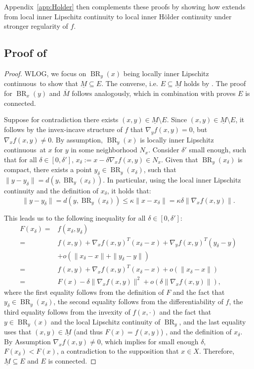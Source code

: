 \documentclass{article}
\newcommand{\lilc}{locally inner Lipschitz continuous}
\DeclareMathOperator{\BR}{BR}
\begin{document}
Appendix~\ref{app:Holder} then complements these proofs by showing how  extends from local inner Lipschitz continuity to local inner Hölder continuity under stronger regularity of $f$.

\subsection{Proof of }
\label{sec:proof:lilc}
\begin{proof}
    WLOG, we focus on $\BR_y(x)$ being \lilc\ to show that $\underline{M}\subseteq E$. The converse, i.e. $E\subseteq \underline{M}$ holds by . The proof for $\BR_x(y)$ and $\overline{M}$ follows analogously, which in combination with  proves $E$ is connected.

    Suppose for contradiction there exists $(x,y)\in \underline{M}\setminus E$.
    Since $(x,y)\in \underline{M}\setminus E$, it follows by the invex-incave structure of $f$ that $\nabla_y f(x,y)=0$, but $\nabla_x f(x,y)\neq 0$.
    By assumption, $\BR_y(x)$ is \lilc\ at $x$ for $y$ in some neighborhood $N_x$.
    Consider $\delta'$ small enough, such that for all $\delta \in [0,\delta']$, $x_\delta:=x- \delta \nabla_x f(x,y) \in N_x$. Given that $\BR_y(x_{\delta})$ is compact, there exists a point $y_{\delta} \in \BR_y(x_\delta)$, such that $\|y-y_{\delta}\|=d (y,\BR_y(x_{\delta}))$. In particular, using the local inner Lipschitz continuity and the definition of $x_\delta$, it holds that:
    \begin{equation*}
       \|y-y_{\delta}\| =d (y,\BR_y(x_{\delta})) \leq \kappa \|x-x_{\delta}\| = \kappa \delta \|\nabla_x f(x,y)\|.
    \end{equation*} 

    This leads us to the following inequality for all $\delta \in [0,\delta']$:
    \begin{align*}
    F(x_\delta) = &f(x_\delta,y_\delta) \\
        =& f(x,y) + \nabla_x f(x,y)^T(x_\delta-x) + \nabla_y f(x,y)^T(y_\delta-y) \\
        &+ o(\|x_\delta-x\| + \|y_\delta-y\|)\\
        =& f(x,y) + \nabla_x f(x,y)^T(x_\delta-x) + o(\|x_\delta-x\| )\\ 
        =& F(x) - \delta \|\nabla_x f(x,y)\|^2 + o(\delta \|\nabla_x f(x,y)\|),
    \end{align*} 
    where the first equality follows from the definition of $F$ and the fact that $y_\delta\in \BR_y(x_\delta)$, the second equality follows from the differentiability of $f$, the third equality follows from the invexity of $f(x,\cdot)$ and the fact that $y\in \BR_y(x)$ and the local Lipschitz continuity of $\BR_y$, and the last equality uses that $(x,y)\in \underline{M}$ (and thus $F(x)=f(x,y)$) , and the definition of $x_\delta$.
    By Assumption $\nabla_x f(x,y)\neq 0$, which implies for small enough $\delta$, $F(x_\delta)<F(x)$, a contradiction to the supposition that $x\in X$. Therefore, $\underline{M}\subseteq E$ and $E$ is connected.
\end{proof}
\end{document}
